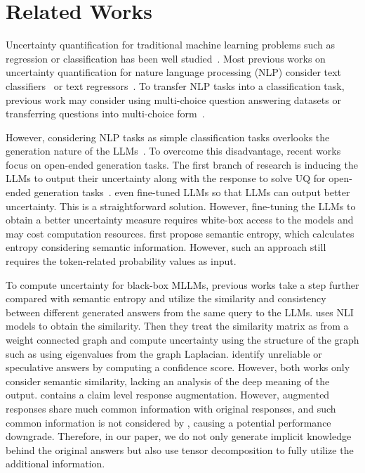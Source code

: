 \section{Related Works}

Uncertainty quantification for traditional machine learning problems such as regression or classification has been well studied~\cite{ye2024uncertainty,amini2020deep,sensoy2018evidential,ovadia2019can}. Most previous works on uncertainty quantification for nature language processing (NLP) consider text classifiers~\cite{jiang2021can,desai2020calibration,kamath2020selective} or text regressors~\cite{glushkova2021uncertainty,wang2022uncertainty}. To transfer NLP tasks into a classification task, previous work may consider using multi-choice question answering datasets or transferring questions into multi-choice form~\cite{kamath2020selective}. 

However, considering NLP tasks as simple classification tasks overlooks the generation nature of the LLMs~\cite{kuhn2023semantic}. To overcome this disadvantage, recent works focus on open-ended generation tasks. The first branch of research is inducing the LLMs to output their uncertainty along with the response to solve UQ for open-ended generation tasks~\cite{tian2023just,kadavath2022language,mielke2020linguistic}. \citet{lin2022teaching} even fine-tuned LLMs so that LLMs can output better uncertainty. This is a straightforward solution. However, fine-tuning the LLMs to obtain a better uncertainty measure requires white-box access to the models and may cost computation resources. \citet{kuhn2023semantic} first propose semantic entropy, which calculates entropy considering semantic information. However, such an approach still requires the token-related probability values as input.

To compute uncertainty for black-box MLLMs, previous works take a step further compared with semantic entropy and utilize the similarity and consistency between different generated answers from the same query to the LLMs. \citet{lin2023generating} uses NLI models to obtain the similarity. Then they treat the similarity matrix as from a weight connected graph and compute uncertainty using the structure of the graph such as using eigenvalues from the graph Laplacian. \citet{chen2024quantifying} identify unreliable or speculative answers by computing a confidence score. However, both works only consider semantic similarity, lacking an analysis of the deep meaning of the output. \citet{da2024llm} contains a claim level response augmentation. However,  augmented responses share much common information with original responses, and such common information is not considered by \citet{da2024llm}, causing a potential performance downgrade.  Therefore, in our paper, we do not only generate implicit knowledge behind the original answers but also use tensor decomposition to fully utilize the additional information.  

\vspace{-3mm}